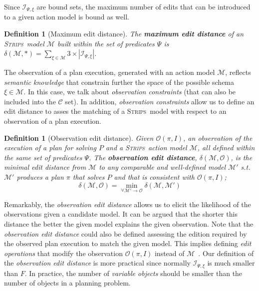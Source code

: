 \documentclass[letterpaper]{article} %
\newcommand{\strips}{\textsc{Strips}}     %
\newtheorem{definition}[theorem]{Definition}
\begin{document}
Since ${\mathcal I}_{\Psi,\xi}$ are bound sets, the maximum number of edits that can be introduced to a given action model is bound as well. 
\begin{definition}[Maximum edit distance]
The \textbf{maximum edit distance} of an \strips\ model $\mathcal{M}$ built within the set of predicates $\Psi$ is $\delta(\mathcal{M},*)=\sum_{\xi\in\mathcal{M}} 3\times|{\mathcal I}_{\Psi,\xi}|$.
\end{definition}

The observation of a plan execution, generated with an action model $\mathcal{M}$, reflects {\em semantic knowledge} that constrain further the space of the possible schema $\xi\in \mathcal{M}$. In this case, we talk about {\em observation constraints} (that can also be included into the $\mathcal{C}$ set). In addition, {\em observation constraints} allow us to define an edit distance to asses the matching of a \strips\ model with respect to an observation of a plan execution. 

\begin{definition}[Observation edit distance]
  Given $\mathcal{O}(\pi,I)$, an observation of the execution of a plan for solving $P$ and a \strips\ action model $\mathcal{M}$, all defined within the same set of predicates $\Psi$. The {\bf observation edit distance}, $\delta(\mathcal{M},\mathcal{O})$, is the minimal edit distance from $\mathcal{M}$ to any {\em comparable} and well-defined model $\mathcal{M}'$ s.t. $\mathcal{M}'$ produces a plan $\pi$ that solves $P$ and that is {\em consistent} with $\mathcal{O}(\pi,I)$; \[\delta(\mathcal{M},\mathcal{O})=\min_{\forall \mathcal{M}' \rightarrow \mathcal{O}} \delta(\mathcal{M},\mathcal{M}')\]
\end{definition}

Remarkably, the {\em observation edit distance} allows us to elicit the likelihood of the observations given a candidate model. It can be argued that the shorter this  distance the better the given model explains the given observation. Note that the {\em observation edit distance} could also be defined assessing the edition required by the observed plan execution to match the given model. This implies defining {\em edit operations} that modify the observation $\mathcal{O}(\pi,I)$ instead of $\mathcal{M}$~\cite{sohrabi:precognition:IJCAI2016}. Our definition of the {\em observation edit distance} is more practical since normally ${\mathcal I}_{\Psi,\xi}$ is much smaller than $F$. In practice, the number of {\em variable objects} should be smaller than the number of objects in a planning problem.
\end{document}
